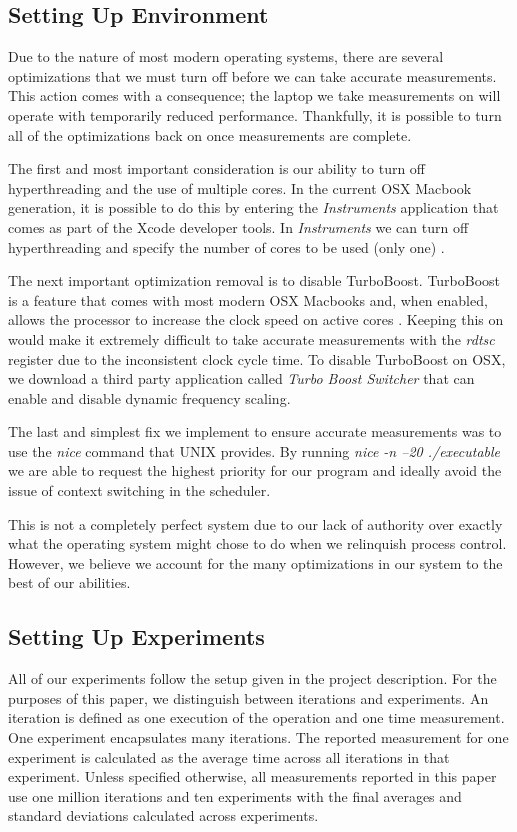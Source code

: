 \documentclass[sigconf]{acmart}
\begin{document}
\subsection{Setting Up Environment}
Due to the nature of most modern operating systems, there are several optimizations that we must turn off before we can take accurate measurements. This action comes with a consequence; the laptop we take measurements on will operate with temporarily reduced performance. Thankfully, it is possible to turn all of the optimizations back on once measurements are complete.

The first and most important consideration is our ability to turn off hyperthreading and the use of multiple cores. In the current OSX Macbook generation, it is possible to do this by entering the \textit{Instruments} application that comes as part of the Xcode developer tools. In \textit{Instruments} we can turn off hyperthreading and specify the number of cores to be used (only one) \cite{hyperthreading}.

The next important optimization removal is to disable TurboBoost. TurboBoost is a feature that comes with most modern OSX Macbooks and, when enabled, allows the processor to increase the clock speed on active cores \cite{shimpi_2011}. Keeping this on would make it extremely difficult to take accurate measurements with the \textit{rdtsc} register due to the inconsistent clock cycle time. To disable TurboBoost on OSX, we download a third party application called \textit{Turbo Boost Switcher} \cite{TurboBoostApp} that can enable and disable dynamic frequency scaling.

The last and simplest fix we implement to ensure accurate measurements was to use the \textit{nice} command that UNIX provides. By running \textit{nice -n --20 ./executable} we are able to request the highest priority for our program and ideally avoid the issue of context switching in the scheduler.

This is not a completely perfect system due to our lack of authority over exactly what the operating system might chose to do when we relinquish process control. However, we believe we account for the many optimizations in our system to the best of our abilities.

\subsection{Setting Up Experiments}
All of our experiments follow the setup given in the project description. For the purposes of this paper, we distinguish between iterations and experiments. An iteration is defined as one execution of the operation and one time measurement. One experiment encapsulates many iterations. The reported measurement for one experiment is calculated as the average time across all iterations in that experiment. Unless specified otherwise, all measurements reported in this paper use one million iterations and ten experiments with the final averages and standard deviations calculated across experiments.
\end{document}
